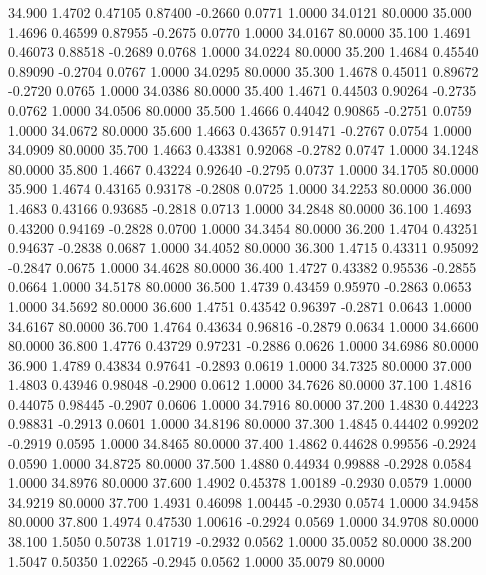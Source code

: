   34.900   1.4702   0.47105   0.87400  -0.2660   0.0771   1.0000  34.0121  80.0000
  35.000   1.4696   0.46599   0.87955  -0.2675   0.0770   1.0000  34.0167  80.0000
  35.100   1.4691   0.46073   0.88518  -0.2689   0.0768   1.0000  34.0224  80.0000
  35.200   1.4684   0.45540   0.89090  -0.2704   0.0767   1.0000  34.0295  80.0000
  35.300   1.4678   0.45011   0.89672  -0.2720   0.0765   1.0000  34.0386  80.0000
  35.400   1.4671   0.44503   0.90264  -0.2735   0.0762   1.0000  34.0506  80.0000
  35.500   1.4666   0.44042   0.90865  -0.2751   0.0759   1.0000  34.0672  80.0000
  35.600   1.4663   0.43657   0.91471  -0.2767   0.0754   1.0000  34.0909  80.0000
  35.700   1.4663   0.43381   0.92068  -0.2782   0.0747   1.0000  34.1248  80.0000
  35.800   1.4667   0.43224   0.92640  -0.2795   0.0737   1.0000  34.1705  80.0000
  35.900   1.4674   0.43165   0.93178  -0.2808   0.0725   1.0000  34.2253  80.0000
  36.000   1.4683   0.43166   0.93685  -0.2818   0.0713   1.0000  34.2848  80.0000
  36.100   1.4693   0.43200   0.94169  -0.2828   0.0700   1.0000  34.3454  80.0000
  36.200   1.4704   0.43251   0.94637  -0.2838   0.0687   1.0000  34.4052  80.0000
  36.300   1.4715   0.43311   0.95092  -0.2847   0.0675   1.0000  34.4628  80.0000
  36.400   1.4727   0.43382   0.95536  -0.2855   0.0664   1.0000  34.5178  80.0000
  36.500   1.4739   0.43459   0.95970  -0.2863   0.0653   1.0000  34.5692  80.0000
  36.600   1.4751   0.43542   0.96397  -0.2871   0.0643   1.0000  34.6167  80.0000
  36.700   1.4764   0.43634   0.96816  -0.2879   0.0634   1.0000  34.6600  80.0000
  36.800   1.4776   0.43729   0.97231  -0.2886   0.0626   1.0000  34.6986  80.0000
  36.900   1.4789   0.43834   0.97641  -0.2893   0.0619   1.0000  34.7325  80.0000
  37.000   1.4803   0.43946   0.98048  -0.2900   0.0612   1.0000  34.7626  80.0000
  37.100   1.4816   0.44075   0.98445  -0.2907   0.0606   1.0000  34.7916  80.0000
  37.200   1.4830   0.44223   0.98831  -0.2913   0.0601   1.0000  34.8196  80.0000
  37.300   1.4845   0.44402   0.99202  -0.2919   0.0595   1.0000  34.8465  80.0000
  37.400   1.4862   0.44628   0.99556  -0.2924   0.0590   1.0000  34.8725  80.0000
  37.500   1.4880   0.44934   0.99888  -0.2928   0.0584   1.0000  34.8976  80.0000
  37.600   1.4902   0.45378   1.00189  -0.2930   0.0579   1.0000  34.9219  80.0000
  37.700   1.4931   0.46098   1.00445  -0.2930   0.0574   1.0000  34.9458  80.0000
  37.800   1.4974   0.47530   1.00616  -0.2924   0.0569   1.0000  34.9708  80.0000
  38.100   1.5050   0.50738   1.01719  -0.2932   0.0562   1.0000  35.0052  80.0000
  38.200   1.5047   0.50350   1.02265  -0.2945   0.0562   1.0000  35.0079  80.0000

